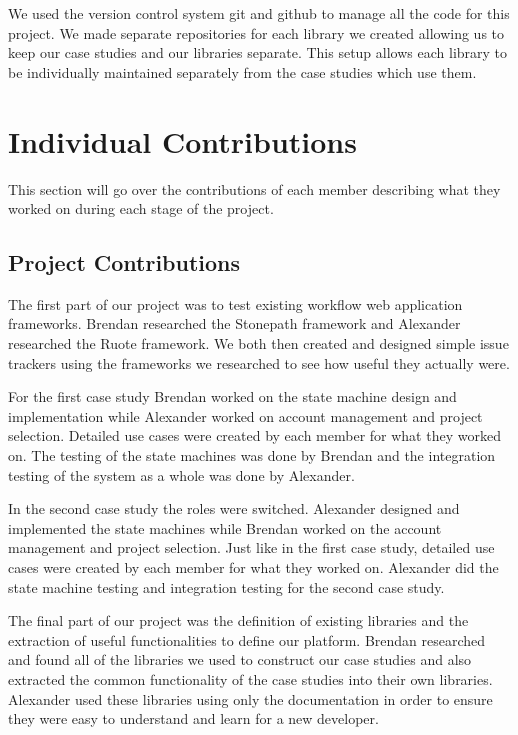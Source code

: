\documentclass[document.tex]{subfiles}
\begin{document}
We used the version control system git and github to manage all the code for this project. We made separate repositories for each library we created allowing us to keep our case studies and our libraries separate. This setup allows each library to be individually  maintained separately from the case studies which use them. 

\section{Individual Contributions}

This section will go over the contributions of each member describing what they worked on during each stage of the project.

\subsection{Project Contributions}

The first part of our project was to test existing workflow web application frameworks. Brendan researched the Stonepath framework and Alexander researched the Ruote framework. We both then created and designed simple issue trackers using the frameworks we researched to see how useful they actually were.

For the first case study Brendan worked on the state machine design and implementation while Alexander worked on account management and project selection. Detailed use cases were created by each member for what they worked on. The testing of the state machines was done by Brendan and the integration testing of the system as a whole was done by Alexander.

In the second case study the roles were switched. Alexander designed and implemented the state machines while Brendan worked on the account management and project selection. Just like in the first case study, detailed use cases were created by each member for what they worked on. Alexander did the state machine testing and integration testing for the second case study.

The final part of our project was the definition of existing libraries and the extraction of useful functionalities to define our platform. Brendan researched and found all of the libraries we used to construct our case studies and also extracted the common functionality of the case studies into their own libraries. Alexander used these libraries using only the documentation in order to ensure they were easy to understand and learn for a new developer.
\end{document}
